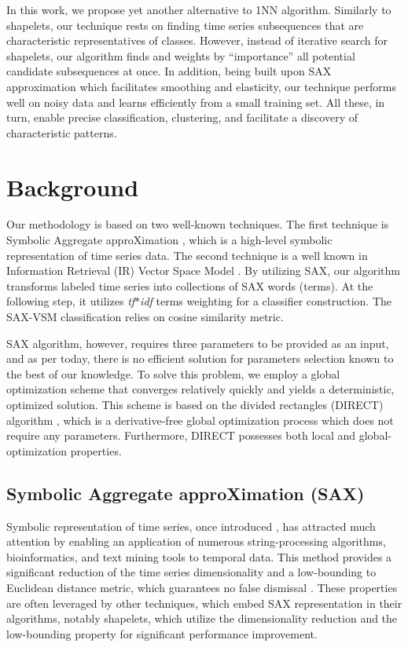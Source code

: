 \documentclass{llncs}
\begin{document}
In this work, we propose yet another alternative to 1NN algorithm. Similarly to shapelets, our
technique rests on finding time series subsequences that are characteristic representatives of
classes. 
However, instead of iterative search for shapelets, our algorithm finds and weights by
``importance'' all potential candidate subsequences at once. 
In addition, being built upon SAX approximation which facilitates smoothing and elasticity, 
our technique performs well on noisy data and learns efficiently from a small training set.
All these, in turn, enable precise classification, clustering, and facilitate a discovery of 
characteristic patterns.

\section{Background}
Our methodology is based on two well-known techniques. The first technique is 
Symbolic Aggregate approXimation \cite{sax}, which is a high-level symbolic  representation 
of time series data. The second technique is a well known in Information Retrieval (IR) 
Vector Space Model \cite{salton}. 
By utilizing SAX, our algorithm transforms labeled time series into collections of SAX 
words (terms). At the following step, it utilizes \textit{tf$\ast$idf} terms weighting for a 
classifier construction. The SAX-VSM classification relies on cosine similarity metric.

SAX algorithm, however, requires three parameters to be provided as an input, and as per 
today, there is no efficient solution for parameters selection known to the best of our knowledge. 
To solve this problem, we employ a global optimization scheme that converges relatively quickly 
and yields a deterministic, optimized solution. 
This scheme is based on the divided rectangles (DIRECT) algorithm \cite{direct}, which is
a derivative-free global optimization process which does not require any parameters.
Furthermore, DIRECT possesses both local and global-optimization properties. 

\enlargethispage{0.5cm} 
\subsection{Symbolic Aggregate approXimation (SAX)}
Symbolic representation of time series, once introduced \cite{sax}, has attracted much attention by
enabling an application of numerous string-processing algorithms, bioinformatics, and text mining 
tools to temporal data. This method provides a significant reduction of the time series 
dimensionality and a low-bounding to Euclidean distance metric, which guarantees no false 
dismissal \cite{hot_sax}.
These properties are often leveraged by other techniques, which embed SAX representation in their
algorithms, notably shapelets, which \cite{fast-shapelets} utilize the dimensionality reduction and 
the low-bounding property for significant performance improvement.
\end{document}

